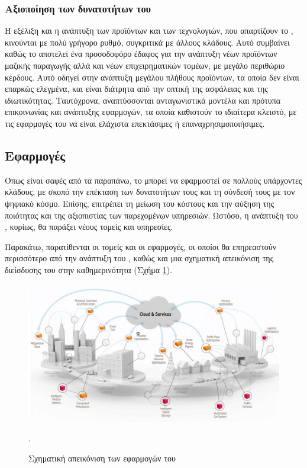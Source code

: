 \subsubsection{Αξιοποίηση των δυνατοτήτων του }
Η εξέλιξη και η ανάπτυξη των προϊόντων και των τεχνολογιών, που απαρτίζουν το , κινούνται με πολύ γρήγορο ρυθμό, συγκριτικά με άλλους κλάδους. 
Αυτό συμβαίνει καθώς το  αποτελεί ένα προσοδοφόρο έδαφος για την ανάπτυξη νέων προϊόντων μαζικής παραγωγής αλλά και νέων επιχειρηματικών τομέων, με μεγάλο περιθώριο κέρδους. 
Αυτό οδηγεί στην ανάπτυξη μεγάλου πλήθους προϊόντων, τα οποία δεν είναι επαρκώς ελεγμένα, και είναι διάτρητα από την οπτική της ασφάλειας και της ιδιωτικότητας. 
Ταυτόχρονα, αναπτύσσονται ανταγωνιστικά μοντέλα και πρότυπα επικοινωνίας και ανάπτυξης εφαρμογών, τα οποία καθιστούν το  ιδιαίτερα κλειστό, με τις εφαρμογές του να είναι ελάχιστα επεκτάσιμες ή επαναχρησιμοποιήσιμες. 
\subsection{Εφαρμογές}
Όπως είναι σαφές από τα παραπάνω, το  μπορεί να εφαρμοστεί σε πολλούς υπάρχοντες κλάδους, με σκοπό την επέκταση των δυνατοτήτων τους και τη σύνδεσή τους με τον ψηφιακό κόσμο.
Επίσης, επιτρέπει τη μείωση του κόστους και την αύξηση της ποιότητας και της αξιοπιστίας των παρεχομένων υπηρεσιών. 
Ωστόσο, η ανάπτυξη του , κυρίως, θα παράξει νέους τομείς και υπηρεσίες.
\par
Παρακάτω, παρατίθενται οι τομείς και οι εφαρμογές, οι οποίοι θα επηρεαστούν περισσότερο από την ανάπτυξη του , καθώς και μια σχηματική απεικόνιση της διείσδυσης του  στην καθημερινότητα (Σχήμα \ref{iotapp}).
\begin{figure}[h!]
\centering
\includegraphics[scale=0.6]{images/iot_applications.png}
\caption{Σχηματική απεικόνιση των εφαρμογών του  \cite{iot_applications}}.
\label{iotapp}
\end{figure}

